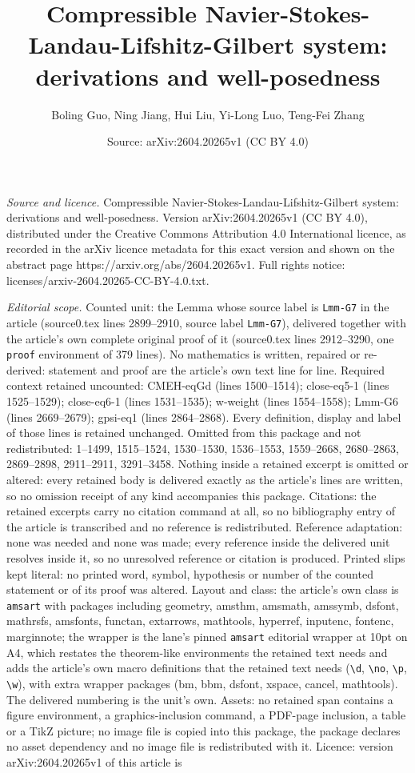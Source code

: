 \documentclass[10pt,a4paper]{amsart}
\title[Compressible Navier-Stokes-Landau-Lifshitz-Gilbert system: d]{Compressible Navier-Stokes-Landau-Lifshitz-Gilbert system: derivations and well-posedness}
\author{Boling Guo, Ning Jiang, Hui Liu, Yi-Long Luo, Teng-Fei Zhang}
\date{Source: arXiv:2604.20265v1 (CC BY 4.0)}
\begin{document}
\maketitle

\noindent\emph{Source and licence.} Compressible Navier-Stokes-Landau-Lifshitz-Gilbert system: derivations and well-posedness. Version arXiv:2604.20265v1 (CC BY 4.0), distributed under the Creative Commons Attribution 4.0 International licence, as recorded in the arXiv licence metadata for this exact version and shown on the abstract page https://arxiv.org/abs/2604.20265v1. Full rights notice: licenses/arxiv-2604.20265-CC-BY-4.0.txt.\par\smallskip

\noindent\textit{Editorial scope.} Counted unit: the Lemma whose source label is \texttt{Lmm-G7} in the article (source0.tex lines 2899--2910, source label \texttt{Lmm-G7}), delivered together with the article's own complete original proof of it (source0.tex lines 2912--3290, one \texttt{proof} environment of 379 lines). No mathematics is written, repaired or re-derived: statement and proof are the article's own text line for line. Required context retained uncounted: CMEH-eqGd (lines 1500--1514); close-eq5-1 (lines 1525--1529); close-eq6-1 (lines 1531--1535); w-weight (lines 1554--1558); Lmm-G6 (lines 2669--2679); gpsi-eq1 (lines 2864--2868). Every definition, display and label of those lines is retained unchanged. Omitted from this package and not redistributed: 1--1499, 1515--1524, 1530--1530, 1536--1553, 1559--2668, 2680--2863, 2869--2898, 2911--2911, 3291--3458. Nothing inside a retained excerpt is omitted or altered: every retained body is delivered exactly as the article's lines are written, so no omission receipt of any kind accompanies this package. Citations: the retained excerpts carry no citation command at all, so no bibliography entry of the article is transcribed and no reference is redistributed. Reference adaptation: none was needed and none was made; every reference inside the delivered unit resolves inside it, so no unresolved reference or citation is produced. Printed slips kept literal: no printed word, symbol, hypothesis or number of the counted statement or of its proof was altered. Layout and class: the article's own class is \texttt{amsart} with packages including geometry, amsthm, amsmath, amssymb, dsfont, mathrsfs, amsfonts, functan, extarrows, mathtools, hyperref, inputenc, fontenc, marginnote; the wrapper is the lane's pinned \texttt{amsart} editorial wrapper at 10pt on A4, which restates the theorem-like environments the retained text needs and adds the article's own macro definitions that the retained text needs (\texttt{\textbackslash d}, \texttt{\textbackslash no}, \texttt{\textbackslash p}, \texttt{\textbackslash w}), with extra wrapper packages (bm, bbm, dsfont, xspace, cancel, mathtools). The delivered numbering is the unit's own. Assets: no retained span contains a figure environment, a graphics-inclusion command, a PDF-page inclusion, a table or a TikZ picture; no image file is copied into this package, the package declares no asset dependency and no image file is redistributed with it. Licence: version arXiv:2604.20265v1 of this article is 
\end{document}
